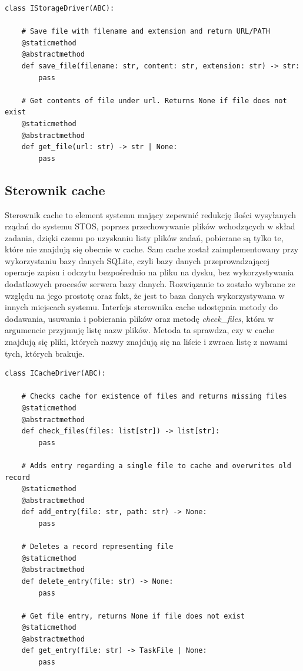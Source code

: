 \lstset{style=python}
\begin{lstlisting}[caption = {Interfejs sterownika systemu plików.}]
    class IStorageDriver(ABC):
    
    # Save file with filename and extension and return URL/PATH
    @staticmethod
    @abstractmethod
    def save_file(filename: str, content: str, extension: str) -> str:
        pass

    # Get contents of file under url. Returns None if file does not exist
    @staticmethod
    @abstractmethod
    def get_file(url: str) -> str | None:
        pass
\end{lstlisting}

\subsection{Sterownik cache}
Sterownik cache to element systemu mający zepewnić redukcję ilości wysyłanych rządań do systemu STOS, poprzez przechowywanie plików wchodzących w skład zadania, dzięki czemu po uzyskaniu listy plików zadań, pobierane są tylko te, które nie znajdują się obecnie w cache. Sam cache został zaimplementowany przy wykorzystaniu bazy danych SQLite\cite{sqlite}, czyli bazy danych przeprowadzającej operacje zapisu i odczytu bezpośrednio na pliku na dysku, bez wykorzystywania dodatkowych procesów serwera bazy danych. Rozwiązanie to zostało wybrane ze względu na jego prostotę oraz fakt, że jest to baza danych wykorzystywana w innych miejscach systemu. Interfejs sterownika cache udostępnia metody do dodawania, usuwania i pobierania plików oraz metodę \textit{check\_files}, która w argumencie przyjmuję listę nazw plików. Metoda ta sprawdza, czy w cache znajdują się pliki, których nazwy znajdują się na liście i zwraca listę z nawami tych, których brakuje.
\lstset{style=python}
\begin{lstlisting}[caption = {Interfejs sterownika systemu plików.}]
    class ICacheDriver(ABC):

    # Checks cache for existence of files and returns missing files
    @staticmethod
    @abstractmethod
    def check_files(files: list[str]) -> list[str]:
        pass

    # Adds entry regarding a single file to cache and overwrites old record
    @staticmethod
    @abstractmethod
    def add_entry(file: str, path: str) -> None:
        pass

    # Deletes a record representing file
    @staticmethod
    @abstractmethod
    def delete_entry(file: str) -> None:
        pass

    # Get file entry, returns None if file does not exist
    @staticmethod
    @abstractmethod
    def get_entry(file: str) -> TaskFile | None:
        pass
\end{lstlisting}

